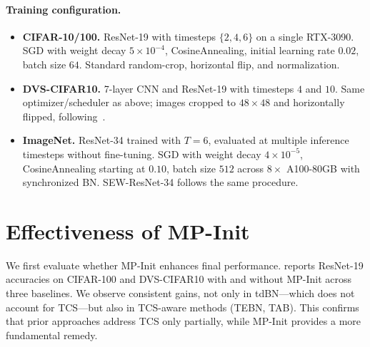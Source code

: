 \paragraph{Training configuration.}
\begin{itemize}[leftmargin=2em,itemsep=2pt]
    \item \textbf{CIFAR-10/100.} ResNet-19 with timesteps $\{2,4,6\}$ on a single RTX-3090. SGD with weight decay $5\times10^{-4}$, CosineAnnealing, initial learning rate $0.02$, batch size $64$. Standard random-crop, horizontal flip, and normalization.
    \item \textbf{DVS-CIFAR10.} 7-layer CNN and ResNet-19 with timesteps $4$ and $10$. Same optimizer/scheduler as above; images cropped to $48\times 48$ and horizontally flipped, following~\cite{tebn:2022, tab:2024}.
    \item \textbf{ImageNet.} ResNet-34 trained with $T=6$, evaluated at multiple inference timesteps without fine-tuning. SGD with weight decay $4\times10^{-5}$, CosineAnnealing starting at $0.10$, batch size $512$ across $8\times$ A100-80GB with synchronized BN. SEW-ResNet-34 follows the same procedure.
\end{itemize}

\section{Effectiveness of MP-Init}
\label{sec:exp_mpinit}

We first evaluate whether MP-Init enhances final performance.  reports ResNet-19 accuracies on CIFAR-100 and DVS-CIFAR10 with and without MP-Init across three baselines. We observe consistent gains, not only in tdBN—which does not account for TCS—but also in TCS-aware methods (TEBN, TAB). This confirms that prior approaches address TCS only partially, while MP-Init provides a more fundamental remedy.

